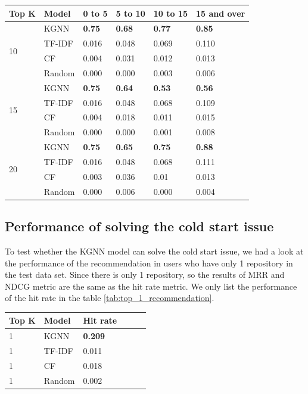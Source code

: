 \documentclass[11pt,twoside]{report}
\begin{document}
\begin{center}
    \begin{tabular}{l | l | l | l | l | l}
    \hline
    Top K & Model & 0 to 5 & 5 to 10 & 10 to 15 & 15 and over \\
    \hline
    \multirow{4}{*}{10} 
    & KGNN & \textbf{0.75} & \textbf{0.68} & \textbf{0.77} & \textbf{0.85} \\
    & TF-IDF & 0.016 & 0.048 & 0.069 & 0.110 \\
    & CF & 0.004 & 0.031 & 0.012 & 0.013 \\
    & Random & 0.000 & 0.000 & 0.003 & 0.006 \\
    \hline
    \multirow{4}{*}{15}
    & KGNN & \textbf{0.75} & \textbf{0.64} & \textbf{0.53} & \textbf{0.56} \\
    & TF-IDF & 0.016 & 0.048 & 0.068 & 0.109 \\
    & CF & 0.004 & 0.018 & 0.011 & 0.015 \\
    & Random & 0.000 & 0.000 & 0.001 & 0.008 \\
    \hline
    \multirow{4}{*}{20}
    & KGNN & \textbf{0.75} & \textbf{0.65} & \textbf{0.75} & \textbf{0.88} \\
    & TF-IDF & 0.016 & 0.048 & 0.068 & 0.111 \\
    & CF & 0.003 & 0.036 & 0.01 & 0.013 \\
    & Random & 0.000 & 0.006 & 0.000 & 0.004 \\
    \end{tabular}
    \label{tab:ndcg_group_performance}
\end{center}

\subsection{Performance of solving the cold start issue}
To test whether the KGNN model can solve the cold start issue, we had a look at the performance of the recommendation in users who have only 1 repository in the test data set. Since there is only 1 repository, so the results of MRR and NDCG metric are the same as the hit rate metric. We only list the performance of the hit rate in the table \ref{tab:top_1_recommendation}.

\begin{center}
    \begin{tabular}{l | l | l | l | l | l}
    \hline
    Top K & Model & Hit rate \\
    \hline
    1 & KGNN & \textbf{0.209} \\
    1 & TF-IDF & 0.011 \\
    1 & CF & 0.018 \\
    1 & Random & 0.002 \\
    \end{tabular}
    \label{tab:top_1_recommendation}
\end{center}
\end{document}
